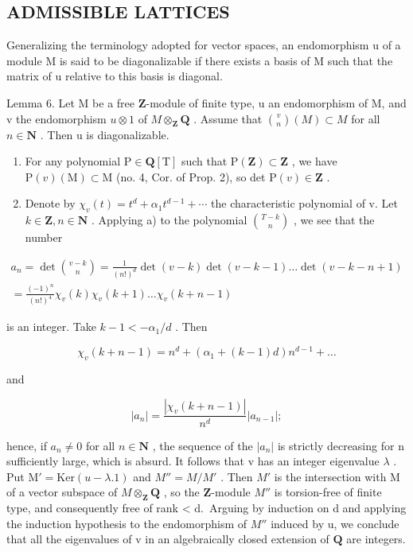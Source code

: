 \subsection{ADMISSIBLE LATTICES}

Generalizing the terminology adopted for vector spaces, an endomorphism u of a module M is said to be diagonalizable if there exists a basis of M such that the matrix of u relative to this basis is diagonal.

Lemma 6. Let M be a free \(\mathbf{Z}\)-module of finite type, u an endomorphism of M, and v the endomorphism \(u \otimes 1\) of \(M \otimes_{\mathbf{Z}} \mathbf{Q}\) . Assume that \(\binom{v}{n}(M) \subset M\) for all \(n \in \mathbf{N}\) . Then u is diagonalizable.

\begin{enumerate}
\def\labelenumi{\alph{enumi})}
\item
  For any polynomial \(\mathrm{P} \in \mathbf{Q}[\mathrm{T}]\) such that \(\mathrm{P}(\mathbf{Z}) \subset \mathbf{Z}\) , we have \(\mathrm{P}(v)(\mathrm{M}) \subset \mathrm{M}\) (no. 4, Cor. of Prop. 2), so det \(\mathrm{P}(v) \in \mathbf{Z}\) .
\item
  Denote by \(\chi_{v}(t)=t^{d}+\alpha_{1}t^{d-1}+\cdots\) the characteristic polynomial of v. Let \(k\in\mathbf{Z}, n\in\mathbf{N}\) . Applying a) to the polynomial \(\binom{T-k}{n}\) , we see that the number
\end{enumerate}

\[
\begin{array}{l} a _ {n} = \det \binom {v - k} {n} = \frac {1}{(n !) ^ {d}} \det (v - k) \det (v - k - 1) \dots \det (v - k - n + 1) \\ = \frac {(- 1) ^ {n}}{(n !) ^ {4}} \chi_ {v} (k) \chi_ {v} (k + 1) \dots \chi_ {v} (k + n - 1) \end{array}
\]

is an integer. Take \(k - 1 < -\alpha_{1} / d\) . Then

\[
\chi_ {v} (k + n - 1) = n ^ {d} + (\alpha_ {1} + (k - 1) d) n ^ {d - 1} + \dots
\]

and

\[
| a _ {n} | = \frac {| \chi_ {v} (k + n - 1) |}{n ^ {d}} | a _ {n - 1} |;
\]

hence, if \(a_{n} \neq 0\) for all \(n \in \mathbf{N}\) , the sequence of the \(|a_{n}|\) is strictly decreasing for n sufficiently large, which is absurd. It follows that v has an integer eigenvalue \(\lambda\) . Put \(\mathrm{M}' = \mathrm{Ker}(u - \lambda.1)\) and \(M'' = M/M'\) . Then \(M'\) is the intersection with M of a vector subspace of \(M \otimes_{\mathbf{Z}} \mathbf{Q}\) , so the \(\mathbf{Z}\)-module \(M''\) is torsion-free of finite type, and consequently free of rank \textless{} d.~Arguing by induction on d and applying the induction hypothesis to the endomorphism of \(M''\) induced by u, we conclude that all the eigenvalues of v in an algebraically closed extension of \(\mathbf{Q}\) are integers.

